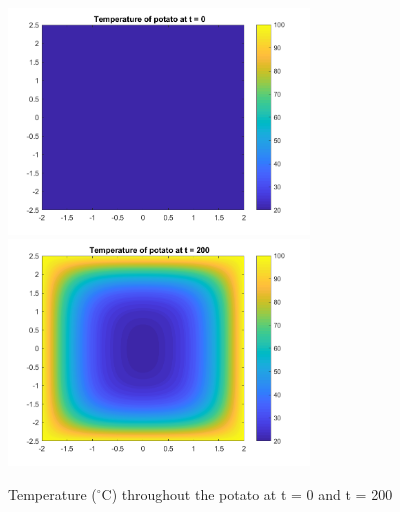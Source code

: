 \documentclass[12pt]{article}
\begin{document}
\begin{figure}[htb]%
    \centering
    {\includegraphics[width=8cm]{Problem1_fig1.png}}%
    \qquad
    {\includegraphics[width=8cm]{Problem1_fig2.png}}%
    \label{fig:p1_fig1-2}%
    \caption*{Temperature ($^{\circ}$C) throughout the potato at t = 0 and t = 200}
\end{figure}
\end{document}
